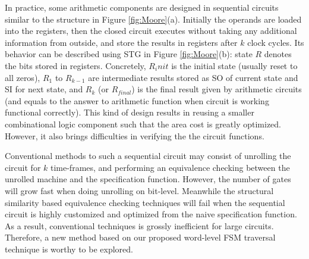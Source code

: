 In practice,
some arithmetic components are designed in sequential circuits similar to the structure in 
Figure \ref{fig:Moore}(a). Initially the operands are loaded into the registers, 
then the closed circuit executes without taking any additional information from outside,
and store the results in registers after $k$ clock cycles. Its behavior can be described using
STG in Figure \ref{fig:Moore}(b): state $R$ denotes the bits stored in registers. Concretely, $R_init$ is the initial
state (usually reset to all zeros), $R_1$ to $R_{k-1}$ are intermediate results stored as SO of current state and SI
for next state, and $R_k$ (or $R_{final}$) is the final result given by arithmetic circuits (and equals to the answer
to arithmetic function when circuit is working functional correctly).
This kind of design results in 
reusing a smaller combinational logic component such that the area cost is greatly optimized.
However, it also brings difficulties in verifying the the circuit functions.

\begin{figure}[H]
\end{figure}

Conventional methods to such a sequential circuit may consist of unrolling the circuit for 
$k$ time-frames, and performing an equivalence checking between the unrolled machine and
the specification function. However, the number of gates will grow fast when doing unrolling
on bit-level. Meanwhile the structural similarity based equivalence checking techniques 
will fail when the sequential circuit is highly customized and optimized from the naive specification 
function. As a result, conventional techniques is grossly inefficient for large circuits.
Therefore, a new method based on our proposed word-level FSM traversal technique is worthy to be explored.

